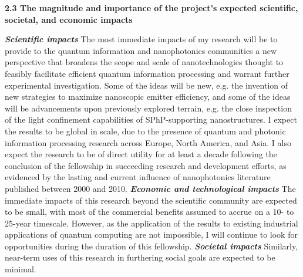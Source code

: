 \documentclass[11pt,a4paper]{article}
\begin{document}
\noindent\textbf{2.3 The magnitude and importance of the project's expected scientific, societal, and economic impacts}

\textbf{\textit{Scientific impacts}} The most immediate impacts of my research will be to provide to the quantum information and nanophotonics communities a new perspective that broadens the scope and scale of nanotechnologies thought to feasibly facilitate efficient quantum information processing and warrant further experimental investigation. Some of the ideas will be new, e.g. the invention of new strategies to maximize nanoscopic emitter efficiency, and some of the ideas will be advancements upon previously explored terrain, e.g. the close inspection of the light confinement capabilities of SPhP-supporting nanostructures. I expect the results to be global in scale, due to the presence of quantum and photonic information processing research across Europe, North America, and Asia. I also expect the research to be of direct utility for at least a decade following the conclusion of the fellowship in succeeding research and development efforts, as evidenced by the lasting and current influence of nanophotonics literature published between 2000 and 2010.\supercite{garcia_de_abajo_optical_2010} \textbf{\textit{Economic and technological impacts}} The immediate impacts of this research beyond the scientific community are expected to be small, with most of the commercial benefits assumed to accrue on a 10- to 25-year timescale. However, as the application of the results to existing industrial applications of quantum computing are not impossible, I will continue to look for opportunities during the duration of this fellowship. \textbf{\textit{Societal impacts}} Similarly, near-term uses of this research in furthering social goals are expected to be minimal.





\end{document}
